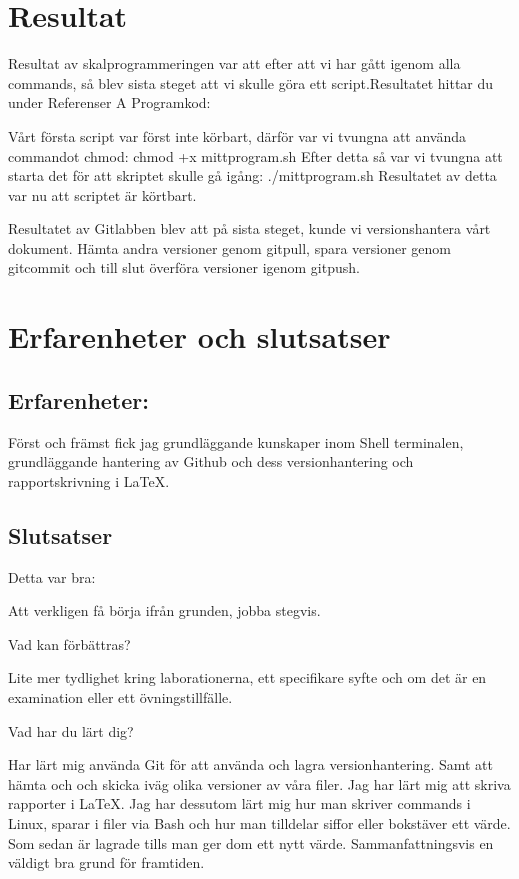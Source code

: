 \documentclass[12pt, a4paper, openright]{article}
\begin{document}
\newpage

\section{Resultat}


Resultat av skalprogrammeringen var att efter att vi har gått igenom alla commands, så blev sista steget att vi skulle göra ett script.Resultatet hittar du under Referenser A Programkod:


Vårt första script var först inte körbart, därför var vi tvungna att använda commandot chmod:
chmod +x mittprogram.sh Efter detta så var vi tvungna att starta det för att skriptet skulle gå igång:
./mittprogram.sh
Resultatet av detta var nu att scriptet är körtbart.

Resultatet av Gitlabben blev att på sista steget, kunde vi versionshantera vårt dokument. Hämta andra versioner genom gitpull, spara versioner genom gitcommit och till slut överföra versioner igenom gitpush.

\newpage

\section{Erfarenheter och slutsatser} 

\subsection{Erfarenheter:}

Först och främst fick jag grundläggande kunskaper inom Shell terminalen, grundläggande hantering av Github och dess versionhantering och rapportskrivning i LaTeX.

\subsection{Slutsatser}

Detta var bra:


\noindent Att verkligen få börja ifrån grunden, jobba stegvis. 

\noindent Vad kan förbättras?


\noindent Lite mer tydlighet kring laborationerna, ett specifikare syfte och om det är en examination eller ett övningstillfälle. 


\noindent Vad har du lärt dig?

\noindent Har lärt mig använda Git för att använda och lagra versionhantering. Samt att hämta och och skicka iväg olika versioner av våra filer. Jag har lärt mig att skriva rapporter i LaTeX.
Jag har dessutom lärt mig hur man skriver commands i Linux, sparar i filer via Bash och hur man tilldelar siffor eller bokstäver ett värde. Som sedan är lagrade tills man ger dom ett nytt värde. Sammanfattningsvis en väldigt bra grund för framtiden. 
\end{document}
